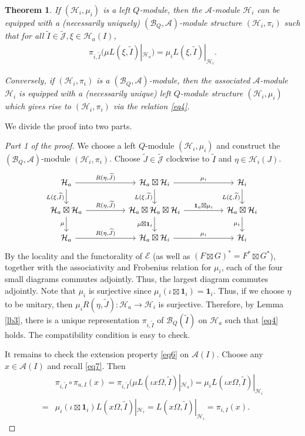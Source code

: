 \documentclass[12pt,a4paper,notitlepage]{article}
\theoremstyle{definition}
\theoremstyle{plain}
\newtheorem{thm}[df]{Theorem}
\newcommand{\mc}{\mathcal}
\newcommand{\wtd}{\widetilde}
\newcommand{\id}{\mathbf{1}}
\newcommand{\scr}{\mathscr}
\newcommand{\Jtd}{\widetilde{\mathcal J}}
\numberwithin{equation}{section}
\begin{document}
\begin{thm}\label{lb6}
If $(\mc H_i,\mu_i)$ is a left $Q$-module, then the $\mc A$-module $\mc H_i$ can be equipped with a  (necessarily uniquely) $(\mc B_Q,\mc A)$-module structure $(\mc H_i,\pi_i)$ such that for all $\wtd I\in\Jtd,\xi\in\mc H_a(I)$,
\begin{align}\label{eq4}
\pi_{i,\wtd I}\big(\mu L(\xi,\wtd I)|_{\mc H_a}\big)=\mu_i L(\xi,\wtd I)|_{\mc H_i}.
\end{align}


Conversely, if $(\mc H_i,\pi_i)$ is a $(\mc B_Q,\mc A)$-module, then the associated $\mc A$-module $\mc H_i$ is equipped with a (necessarily unique) left $Q$-module structure $(\mc H_i,\mu_i)$ which gives rise to $(\mc H_i,\pi_i)$ via the relation \eqref{eq4}.
\end{thm}

We divide the proof into two parts.

\begin{proof}[Part 1 of the proof]
We choose a left $Q$-module $(\mc H_i,\mu_i)$ and construct the $(\mc B_Q,\mc A)$-module $(\mc H_i,\pi_i)$. Choose $\wtd J\in\Jtd$ clockwise to $\wtd I$ and $\eta\in\mc H_i(J)$.
\begin{equation}\label{eq27}
\begin{tikzcd}
\mc H_a\arrow[rr,"{R(\eta,\wtd J)}"]\arrow[d,"{L(\xi,\wtd I)}"'] &&\mc H_a\boxtimes\mc H_i\arrow[rr,"\mu_i"]\arrow[d,"{L(\xi,\wtd I)}"']&&\mc H_i\arrow[d,"{L(\xi,\wtd I)}"']\\
\mc H_a\boxtimes\mc H_a\arrow[rr,"{R(\eta,\wtd J)}"]\arrow[d,"\mu"']&&\mc H_a\boxtimes\mc H_a\boxtimes\mc H_i\arrow[rr,"\id_a\boxtimes\mu_i"]\arrow[d,"\mu\boxtimes\id_i"']&&\mc H_a\boxtimes\mc H_i\arrow[d,"\mu_i"']\\
\mc H_a\arrow[rr,"{R(\eta,\wtd J)}"]&&\mc H_a\boxtimes\mc H_i\arrow[rr,"\mu_i"]&&\mc H_i
\end{tikzcd}
\end{equation}
By the locality and the functorality of $\scr E$ (as well as $(F\boxtimes G)^*=F^*\boxtimes G^*$), together with the associativity and Frobenius relation for $\mu_i$, each of the four small diagrams commutes adjointly. Thus, the largest diagram commutes adjointly. Note that $\mu_i$ is surjective since $\mu_i(\iota\boxtimes\id_i)=\id_i$. Thus, if we choose $\eta$ to be unitary, then $\mu_i R(\eta,\wtd J):\mc H_a\rightarrow\mc H_i$ is surjective. Therefore, by Lemma \ref{lb3}, there is a unique representation $\pi_{i,\wtd I}$ of $\mc B_Q(\wtd I)$ on $\mc H_a$ such that \eqref{eq4} holds. The compatibility condition is easy to check.

It remains to check the extension property \eqref{eq6} on $\mc A(I)$. Choose any $x\in\mc A(I)$ and recall \eqref{eq7}. Then
\begin{align}
&\pi_{i,\wtd I}\circ\pi_{a,I}(x)=\pi_{i,\wtd I}(\mu L(\iota x\Omega,\wtd I)|_{\mc H_a})=\mu_i L(\iota x\Omega,\wtd I)|_{\mc H_i}\nonumber\\
=&\mu_i(\iota\boxtimes \id_i) L(x\Omega,\wtd I)|_{\mc H_i}=L(x\Omega,\wtd I)|_{\mc H_i}=\pi_{i,I}(x).\label{eq12}
\end{align}
\end{proof}
\end{document}
